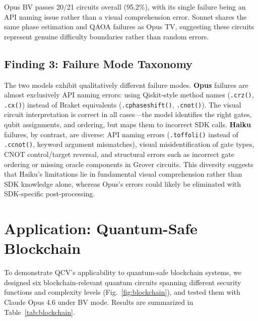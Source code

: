 \documentclass[conference]{IEEEtran}
\begin{document}
Opus BV passes 20/21 circuits overall (95.2\%), with its single failure being an API naming issue rather than a visual comprehension error. Sonnet shares the same phase estimation and QAOA failures as Opus TV, suggesting these circuits represent genuine difficulty boundaries rather than random errors.

\subsection{Finding 3: Failure Mode Taxonomy}

The two models exhibit qualitatively different failure modes. \textbf{Opus} failures are almost exclusively API naming errors: using Qiskit-style method names (\texttt{.crz()}, \texttt{.cx()}) instead of Braket equivalents (\texttt{.cphaseshift()}, \texttt{.cnot()}). The visual circuit interpretation is correct in all cases---the model identifies the right gates, qubit assignments, and ordering, but maps them to incorrect SDK calls. \textbf{Haiku} failures, by contrast, are diverse: API naming errors (\texttt{.toffoli()} instead of \texttt{.ccnot()}, keyword argument mismatches), visual misidentification of gate types, CNOT control/target reversal, and structural errors such as incorrect gate ordering or missing oracle components in Grover circuits. This diversity suggests that Haiku's limitations lie in fundamental visual comprehension rather than SDK knowledge alone, whereas Opus's errors could likely be eliminated with SDK-specific post-processing.

\section{Application: Quantum-Safe Blockchain}

To demonstrate QCV's applicability to quantum-safe blockchain systems, we designed six blockchain-relevant quantum circuits spanning different security functions and complexity levels (Fig.~\ref{fig:blockchain}), and tested them with Claude Opus 4.6 under BV mode. Results are summarized in Table~\ref{tab:blockchain}.
\end{document}
